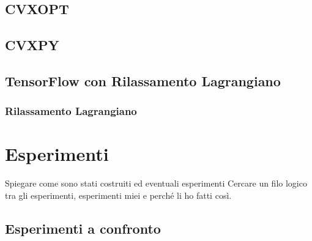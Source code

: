 \documentclass[a4paper,12pt]{report}
\begin{document}

    








\section{CVXOPT}
\section{CVXPY}
\section{TensorFlow con Rilassamento Lagrangiano}
\subsection{Rilassamento Lagrangiano}

%

\chapter{Esperimenti}
\label{Captiolo 3}

Spiegare come sono stati costruiti ed eventuali esperimenti
Cercare un filo logico tra gli esperimenti, esperimenti miei e perché li ho fatti così.
\section{Esperimenti a confronto}
\end{document}
